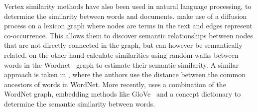 Vertex similarity methods have also been used in natural
language processing, to determine the similarity between
words and documents. \citet{semantic-similarity} make use
of a diffusion process on a lexicon graph where nodes
are terms in the text and edges represent co-occurrence.
This allows them to discover semantic relationships between
nodes that are not directly connected in the graph, but
can however be semantically related. \citet{semantic-sim-random-walk}
on the other hand calculate similarities using random walks between words
in the Wordnet~\cite{wordnet} graph to estimate their semantic
similarity. A similar approach is taken in \cite{wordnet-graph-sim},
where the authors use the distance between the common ancestors
of words in WordNet. More recently, \citet{word-sim-concepts} uses
a combination of the WordNet graph, embedding methods like GloVe~\cite{glove}
and a concept dictionary to determine the semantic similarity between
words.